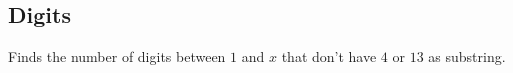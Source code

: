 \subsection{Digits}

Finds the number of digits between $1$ and $x$ that don't have $4$ or $13$ as substring.

